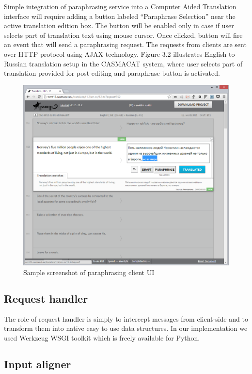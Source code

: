 Simple integration of paraphrasing service into a Computer Aided Translation interface will require adding a button labeled ``Paraphrase Selection'' near the active translation edition box. The button will be enabled only in case if user selects part of translation text using mouse cursor. Once clicked, button will fire an event that will send a paraphrasing request. The requests from clients are sent over HTTP protocol using AJAX technology. Figure 3.2 illustrates English to Russian translation setup in the CASMACAT system, where user selects part of translation provided for post-editing and paraphrase button is activated.

\begin{figure}
 \centering
 \includegraphics[scale=0.5]{g/screenshot.png}
 \caption{Sample screenshot of paraphrasing client UI}
\end{figure}

\subsection{Request handler}

The role of request handler is simply to intercept messages from client-side and to transform them into native easy to use data structures. In our implementation we used Werkzeug WSGI toolkit which is freely available for Python.

\subsection{Input aligner}

